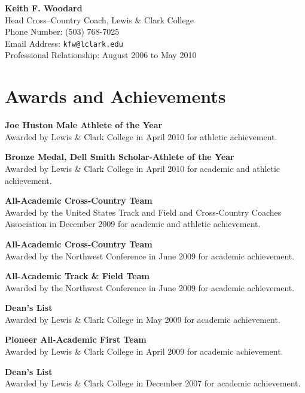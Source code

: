\documentclass{res}
\newcommand{\reference}[6]{\textbf{#1}\\#2\\Phone Number: #3\\Email Address:
\texttt{#4}\\Professional Relationship: #5\\#6}
\begin{document}
\begin{resume}
	\reference{Keith F. Woodard}
    {Head Cross--Country Coach, Lewis \& Clark College}
    {(503) 768-7025}
    {kfw@lclark.edu}
    {August 2006 to May 2010}

\section{Awards and Achievements}
    \textbf{Joe Huston Male Athlete of the Year}\\
    Awarded by Lewis \& Clark College in April 2010 for athletic achievement.

    \textbf{Bronze Medal, Dell Smith Scholar-Athlete of the Year}\\
    Awarded by Lewis \& Clark College in April 2010 for academic and athletic
    achievement.

    \textbf{All-Academic Cross-Country Team}\\
    Awarded by the United States Track and Field and Cross-Country Coaches
    Association in December 2009 for academic and athletic achievement.

    \textbf{All-Academic Cross-Country Team}\\
    Awarded by the Northwest Conference in June 2009 for academic achievement.
 
    \textbf{All-Academic Track \& Field Team}\\
    Awarded by the Northwest Conference in June 2009 for academic achievement.
 
    \textbf{Dean's List}\\
    Awarded by Lewis \& Clark College in May 2009 for academic achievement.
 
    \textbf{Pioneer All-Academic First Team}\\
    Awarded by Lewis \& Clark College in April 2009 for academic achievement.
 
    \textbf{Dean's List}\\
    Awarded by Lewis \& Clark College in December 2007 for academic achievement.


\end{resume}
\end{document}
